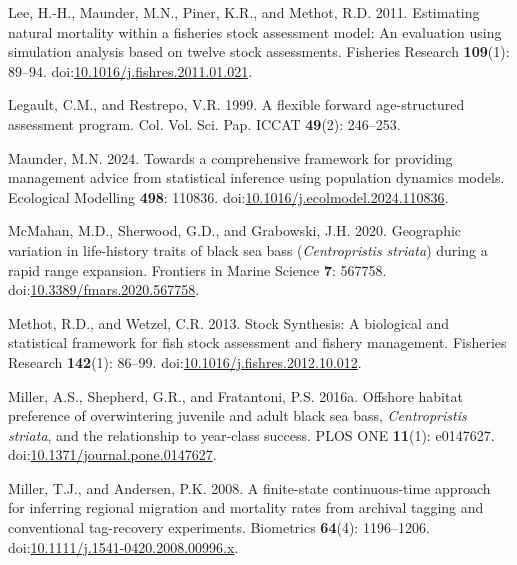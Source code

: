 \documentclass[
]{article}
\newlength{\cslhangindent}
\newlength{\cslentryspacingunit} %
\newenvironment{CSLReferences}[2] %
 {%
  \setlength{\parindent}{0pt}
  \ifodd #1
  \let\oldpar\par
  \def\par{\hangindent=\cslhangindent\oldpar}
  \fi
  \setlength{\parskip}{#2\cslentryspacingunit}
 }%
 {}
\begin{document}
\begin{CSLReferences}{1}{0}
\leavevmode{}%
Lee, H.-H., Maunder, M.N., Piner, K.R., and Methot, R.D. 2011.
Estimating natural mortality within a fisheries stock assessment model:
An evaluation using simulation analysis based on twelve stock
assessments. Fisheries Research \textbf{109}(1): 89--94.
doi:\href{https://doi.org/10.1016/j.fishres.2011.01.021}{10.1016/j.fishres.2011.01.021}.

\leavevmode{}%
Legault, C.M., and Restrepo, V.R. 1999. A flexible forward
age-structured assessment program. Col. Vol. Sci. Pap. ICCAT
\textbf{49}(2): 246--253.

\leavevmode{}%
Maunder, M.N. 2024. Towards a comprehensive framework for providing
management advice from statistical inference using population dynamics
models. Ecological Modelling \textbf{498}: 110836.
doi:\href{https://doi.org/10.1016/j.ecolmodel.2024.110836}{10.1016/j.ecolmodel.2024.110836}.

\leavevmode{}%
McMahan, M.D., Sherwood, G.D., and Grabowski, J.H. 2020. Geographic
variation in life-history traits of black sea bass
(\emph{{C}entropristis striata}) during a rapid range expansion.
Frontiers in Marine Science \textbf{7}: 567758.
doi:\href{https://doi.org/10.3389/fmars.2020.567758}{10.3389/fmars.2020.567758}.

\leavevmode{}%
Methot, R.D., and Wetzel, C.R. 2013. Stock {S}ynthesis: A biological and
statistical framework for fish stock assessment and fishery management.
Fisheries Research \textbf{142}(1): 86--99.
doi:\href{https://doi.org/10.1016/j.fishres.2012.10.012}{10.1016/j.fishres.2012.10.012}.

\leavevmode{}%
Miller, A.S., Shepherd, G.R., and Fratantoni, P.S. 2016a. Offshore
habitat preference of overwintering juvenile and adult black sea bass,
\emph{{C}entropristis} \emph{striata}, and the relationship to
year-class success. {PLOS} {ONE} \textbf{11}(1): e0147627.
doi:\href{https://doi.org/10.1371/journal.pone.0147627}{10.1371/journal.pone.0147627}.

\leavevmode{}%
Miller, T.J., and Andersen, P.K. 2008. A finite-state continuous-time
approach for inferring regional migration and mortality rates from
archival tagging and conventional tag-recovery experiments. Biometrics
\textbf{64}(4): 1196--1206.
doi:\href{https://doi.org/10.1111/j.1541-0420.2008.00996.x}{10.1111/j.1541-0420.2008.00996.x}.


\end{CSLReferences}
\end{document}
